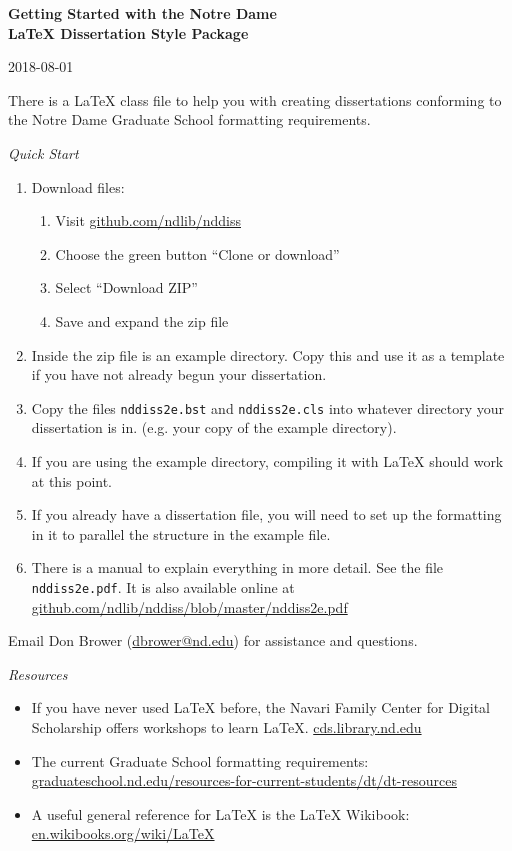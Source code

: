 \documentclass[10pt]{article}
\begin{document}
\begin{center}
    \textbf{Getting Started with the Notre Dame\\ LaTeX Dissertation Style Package}
\end{center}

\begin{flushright}
    2018-08-01
\end{flushright}

There is a LaTeX class file to help you with creating dissertations
conforming to the Notre Dame Graduate School formatting requirements.

\begin{center}\textit{Quick Start}\end{center}

\begin{enumerate}
    \item Download files: \begin{enumerate}
            \item Visit \url{github.com/ndlib/nddiss}
            \item Choose the green button ``Clone or download''
            \item Select ``Download ZIP''
            \item Save and expand the zip file
        \end{enumerate}
    \item Inside the zip file is an example directory. Copy this and use it as a template if you have not already begun your dissertation.
    \item Copy the files \texttt{nddiss2e.bst} and \texttt{nddiss2e.cls} into whatever directory your dissertation is in. (e.g. your copy of the example directory).
    \item If you are using the example directory, compiling it with LaTeX should work at this point.
    \item If you already have a dissertation file, you will need to set up the formatting in it to parallel the structure in the example file.
    \item There is a manual to explain everything in more detail. See the file \texttt{nddiss2e.pdf}. It is also available online at 
\url{github.com/ndlib/nddiss/blob/master/nddiss2e.pdf}
\end{enumerate}

Email Don Brower (\url{dbrower@nd.edu}) for assistance and questions.

\begin{center}\textit{Resources}\end{center}
\begin{itemize}
    \item If you have never used LaTeX before, the Navari Family Center for Digital Scholarship offers workshops to learn LaTeX.
        \url{cds.library.nd.edu}
    \item The current Graduate School formatting requirements:
        \url{graduateschool.nd.edu/resources-for-current-students/dt/dt-resources}
    \item A useful general reference for LaTeX is the LaTeX Wikibook:
        \url{en.wikibooks.org/wiki/LaTeX}
\end{itemize}
\end{document}

